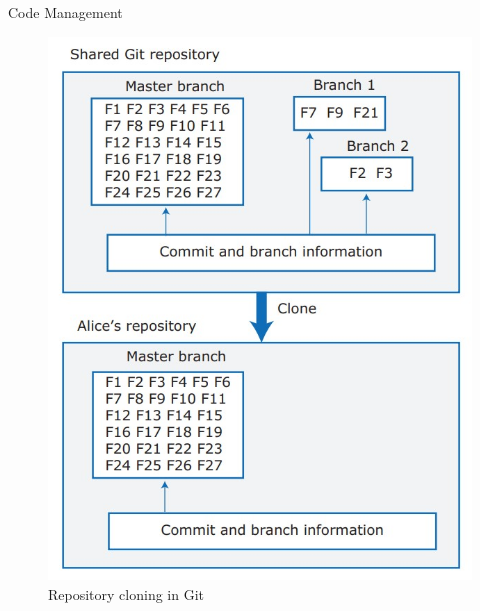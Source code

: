 \documentclass{beamer}
\begin{document}
\begin{frame}{Code Management}
		\begin{figure}
		\includegraphics[scale=.4]{img/m3_39}
		\caption{Repository cloning in Git}
	\end{figure}
\end{frame}
\end{document}
